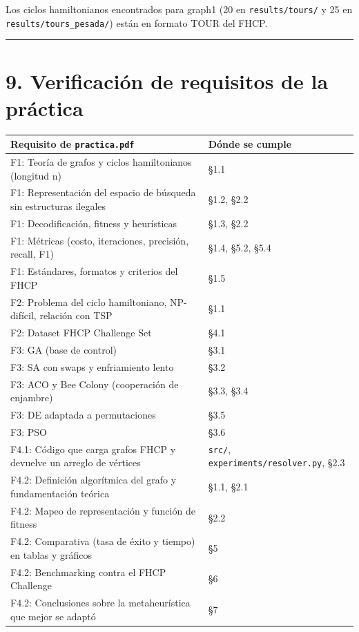 \documentclass[
  spanish,
  12pt,
]{article}
\newcounter{none} %
\begin{document}
Los ciclos hamiltonianos encontrados para graph1 (20 en
\texttt{results/tours/} y 25 en \texttt{results/tours\_pesada/}) están
en formato TOUR del FHCP.

\begin{center}\rule{0.5\linewidth}{0.5pt}\end{center}

\clearpage
\section{9. Verificación de requisitos de la
práctica}\label{verificaciuxf3n-de-requisitos-de-la-pruxe1ctica}

{\def\LTcaptype{none} %
\begin{longtable}[]{@{}
  >{\raggedright\arraybackslash}p{}
  >{\raggedright\arraybackslash}p{}@{}}
\toprule\noalign{}
\begin{minipage}[b]{\linewidth}\raggedright
Requisito de \texttt{practica.pdf}
\end{minipage} & \begin{minipage}[b]{\linewidth}\raggedright
Dónde se cumple
\end{minipage} \\
\midrule\noalign{}
\endhead
\bottomrule\noalign{}
\endlastfoot
F1: Teoría de grafos y ciclos hamiltonianos (longitud n) & §1.1 \\
F1: Representación del espacio de búsqueda sin estructuras ilegales &
§1.2, §2.2 \\
F1: Decodificación, fitness y heurísticas & §1.3, §2.2 \\
F1: Métricas (costo, iteraciones, precisión, recall, F1) & §1.4, §5.2,
§5.4 \\
F1: Estándares, formatos y criterios del FHCP & §1.5 \\
F2: Problema del ciclo hamiltoniano, NP-difícil, relación con TSP &
§1.1 \\
F2: Dataset FHCP Challenge Set & §4.1 \\
F3: GA (base de control) & §3.1 \\
F3: SA con swaps y enfriamiento lento & §3.2 \\
F3: ACO y Bee Colony (cooperación de enjambre) & §3.3, §3.4 \\
F3: DE adaptada a permutaciones & §3.5 \\
F3: PSO & §3.6 \\
F4.1: Código que carga grafos FHCP y devuelve un arreglo de vértices &
\texttt{src/}, \texttt{experiments/resolver.py}, §2.3 \\
F4.2: Definición algorítmica del grafo y fundamentación teórica & §1.1,
§2.1 \\
F4.2: Mapeo de representación y función de fitness & §2.2 \\
F4.2: Comparativa (tasa de éxito y tiempo) en tablas y gráficos & §5 \\
F4.2: Benchmarking contra el FHCP Challenge & §6 \\
F4.2: Conclusiones sobre la metaheurística que mejor se adaptó & §7 \\
\end{longtable}
}
\end{document}
